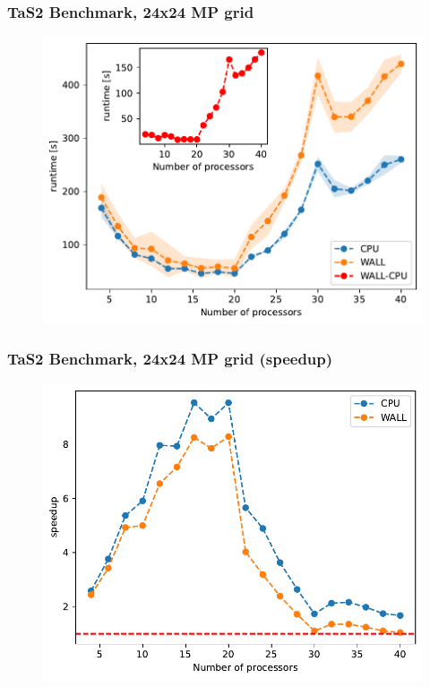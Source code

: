 \documentclass{beamer}
\begin{document}
\begin{frame}
    \frametitle{TaS2 Benchmark, 24x24 MP grid}
    \begin{figure}
        \includegraphics[width=\linewidth, height=\textheight,keepaspectratio]{TaS2_bench_nprocs_24x24.pdf}
    \end{figure}
\end{frame}

\begin{frame}
    \frametitle{TaS2 Benchmark, 24x24 MP grid (speedup)}
    \begin{figure}
        \includegraphics[width=\linewidth, height=\textheight,keepaspectratio]{TaS2_bench_nprocs_24x24_speedup.pdf}
    \end{figure}
\end{frame}
\end{document}
